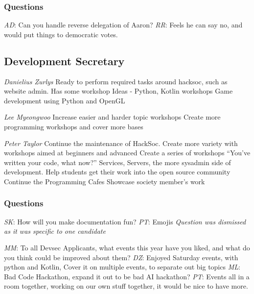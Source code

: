 \documentclass[11pt]{meetingmins}
\begin{document}
\subsubsection{Questions}
\begin{items}
	\item
	\textit{AD}: Can you handle reverse delegation of Aaron?
		\subitem
		\textit{RR}:
			\subsubitem
			Feels he can say no, and would put things to democratic votes.
\end{items}


\subsection{Development Secretary}
\begin{items}
	\item
	\textit{Danielius Zurlys}
		\subitem
		Ready to perform required tasks around hacksoc, such as website admin.
		\subitem
		Has some workshop Ideas - Python, Kotlin workshops
		\subitem
		Game development using Python and OpenGL
	
	\item
	\textit{Lee Myeongwoo}
		\subitem
		Increase easier and harder topic workshops
		\subitem
		Create more programming workshops and cover more bases
	
	\item
	\textit{Peter Taylor}
		\subitem
		Continue the maintenance of HackSoc.
		\subitem
		Create more variety with workshops aimed at beginners and advanced
		\subitem
		Create a series of workshops ``You've written your code, what now?''
		\subitem
		Services, Servers, the more sysadmin side of development.
		\subitem
		Help students get their work into the open source community
		\subitem
		Continue the Programming Cafes
		\subitem
		Showcase society member's work
\end{items}

\subsubsection{Questions}
\begin{items}
	\item
	\textit{SK}: How will you make documentation fun?
		\subitem
		\textit{PT}:
			\subsubitem
			Emojis
		\subitem
		\textit{Question was dismissed as it was specific to one candidate}

	\item
	\textit{MM}: To all Devsec Applicants, what events this year have you liked, and what do you think could be improved about them?
		\subitem
		\textit{DZ}:
			\subsubitem
			Enjoyed Saturday events, with python and Kotlin, Cover it on multiple events, to separate out big topics
		\subitem
		\textit{ML}:
			\subsubitem
			Bad Code Hackathon, expand it out to be bad AI hackathon?
		\subitem
		\textit{PT}:
			\subsubitem
			Events all in a room together, working on our own stuff together, it would be nice to have more.	
	
\end{items}
\end{document}
